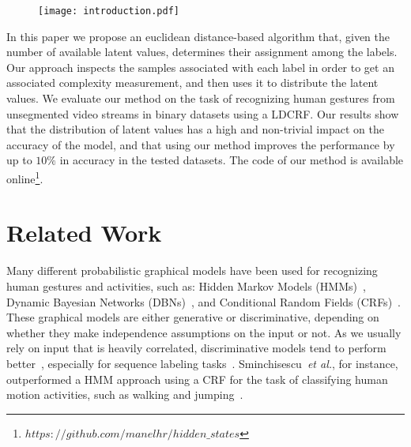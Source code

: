 \documentclass[10pt, conference]{IEEEtran}
\begin{document}
\begin{figure}[t]
\begin{center}
\texttt{[image: introduction.pdf]}
\end{center}
  \label{introfig}
\end{figure}

In this paper we propose an euclidean distance-based algorithm that, given the number of available latent values, determines their assignment among the labels.
Our approach inspects the samples associated with each label in order to get an associated complexity measurement, and then uses it to distribute the latent values.
We evaluate our method on the task of recognizing human gestures from unsegmented video streams in binary datasets using a LDCRF.
Our results show that the distribution of latent values has a high and non-trivial impact on the accuracy of the model, and that using our method  improves the performance by up to $10\%$ in accuracy in the tested datasets. 
The code of our method is available online\footnote{$https://github.com/manelhr/hidden\_states$}.

\section{Related Work}
\label{rw}
Many different probabilistic graphical models have been used for recognizing human gestures and activities, such as: Hidden Markov Models (HMMs)~\cite{hmmheadnod,hmmsignlan,hmmacti}, Dynamic Bayesian Networks (DBNs)~\cite{dinbay}, and Conditional Random Fields (CRFs)~\cite{crfaction,hucrf}. 
These graphical models are either generative or discriminative, depending on whether they make independence assumptions on the input or not.  As we usually rely on input that is heavily correlated, discriminative models tend to perform better~\cite{gdmodels}, especially for sequence labeling tasks~\cite{hucrf,ldcrf}. 
Sminchisescu~\textit{et al.}, for instance, outperformed a HMM approach using  a CRF for the task of classifying human motion activities, such as walking and jumping~\cite{crfaction}. 
\end{document}
